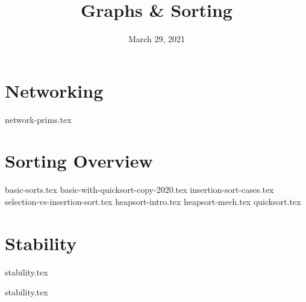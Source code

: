 \documentclass[11pt]{exam}
\title{Graphs & Sorting}
\date{March 29, 2021}
\begin{document}
\maketitle

\section{Networking}
{network-prims.tex}
\vspace{15mm}


\section{Sorting Overview}
\begin{questions}
{basic-sorts.tex}
{basic-with-quicksort-copy-2020.tex}
{insertion-sort-cases.tex}
\vspace{15mm}
{selection-vs-insertion-sort.tex}
\vspace{15mm}
{heapsort-intro.tex}
\vspace{15mm}
{heapsort-mech.tex}
\vspace{15mm}
{quicksort.tex}
\end{questions}





\section{Stability}
{stability.tex}
\begin{questions}
{stability.tex}
\end{questions}
\end{document}
